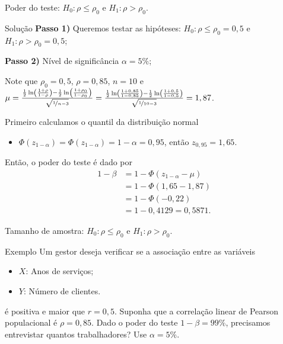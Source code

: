 \documentclass[9pt]{beamer}
\begin{document}
\begin{frame}{Poder do teste: $H_0:\rho \leq \rho_0$ e $H_1: \rho > \rho_0$.}

\begin{block}{Solução}
	\textbf{Passo 1)} Queremos testar as hipóteses: $H_0: \rho \leq \rho_0= 0,5$ e $H_1:\rho > \rho_0= 0,5$;
	
	\textbf{Passo 2)} Nível de significância $\alpha=5\%$;
	
	Note que $\rho_0 = 0,5$, $\rho = 0,85$, $n = 10$ e $\mu = \frac{ \frac{1}{2} \ln\left( \frac{1 + \rho}{1 - \rho} \right) -\frac{1}{2} \ln\left( \frac{1 + \rho_0}{1 - \rho_0} \right)  }{\sqrt{\nicefrac{1}{n-3}}} = \allowbreak \frac{ \frac{1}{2} \ln\left( \frac{1 + 0,85}{1 - 0,85} \right) -\frac{1}{2} \ln\left( \frac{1 + 0,5}{1 - 0,5} \right)  }{\sqrt{\nicefrac{1}{10-3}}} = 1,87$.
	
	Primeiro calculamos o quantil da distribuição normal
	\begin{itemize}
		\item $\Phi\left( z_{1-\alpha} \right) = \Phi\left( z_{1-\alpha} \right) = 1 - \alpha = 0,95$, então $z_{0,95} = 1,65$.
	\end{itemize}

	Então, o poder do teste é dado por
	\begin{align*}
		1-\beta &= 1 - \Phi \left( z_{1-\alpha} - \mu \right)\\
		&= 1 - \Phi \left(1,65 - 1,87 \right)\\
		&= 1 - \Phi\left( -0,22 \right)\\
		&= 1 - 0,4129 = 0,5871.
	\end{align*}
\end{block}
\end{frame}

\begin{frame}{Tamanho de amostra: $H_0:\rho \leq \rho_0$ e $H_1: \rho > \rho_0$.}

\begin{block}{Exemplo}
	Um gestor deseja verificar se a associação entre as variáveis
	\begin{itemize}
		\item $X$: Anos de serviços;
		\item $Y$: Número de clientes.
	\end{itemize}
	é  positiva e maior que $r=0,5$. Suponha que a correlação linear de Pearson populacional é $\rho=0,85$. Dado o poder do teste $1-\beta=99\%$, precisamos entrevistar quantos trabalhadores? Use $\alpha=5\%$. 
\end{block}

\end{frame}
\end{document}
